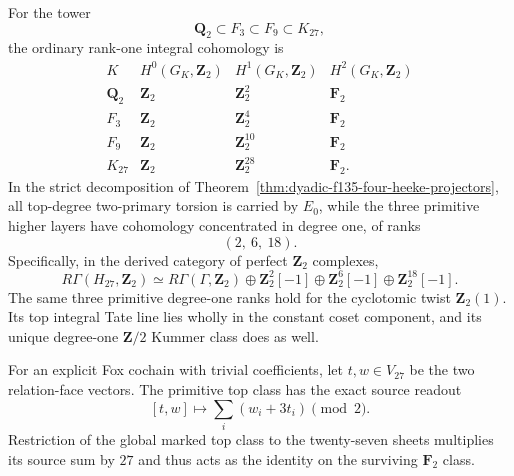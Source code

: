 \begin{corollary}
\label{cor:dyadic-f135-27sheet-cohom-layers}
For the tower
\[
\mathbf Q_2\subset
F_3\subset F_9\subset K_{27},
\]
the ordinary
rank-one integral
cohomology is
\[
\begin{array}{c|ccc}
K&H^0(G_K,\mathbf Z_2)&
H^1(G_K,\mathbf Z_2)&
H^2(G_K,\mathbf Z_2)\\ \hline
\mathbf Q_2&\mathbf Z_2&\mathbf Z_2^2&\mathbf F_2\\
F_3&\mathbf Z_2&\mathbf Z_2^4&\mathbf F_2\\
F_9&\mathbf Z_2&\mathbf Z_2^{10}&\mathbf F_2\\
K_{27}&\mathbf Z_2&\mathbf Z_2^{28}&\mathbf F_2.
\end{array}
\]
In the
strict decomposition
of
Theorem~\ref{thm:dyadic-f135-four-heeke-projectors},
all top-degree
two-primary torsion
is carried by
$E_0$, while
the three primitive
higher layers have
cohomology concentrated
in degree one,
of ranks
\begin{equation}\label{eq:dyadic-f135-layer-H1-ledger}
\boxed{\qquad
(2,\ 6,\ 18).
\qquad}
\end{equation}
Specifically, in
the derived category
of perfect
$\mathbf Z_2$
complexes,
\begin{equation}\label{eq:dyadic-f135-odd-tower-derived-splitting}
\boxed{
R\Gamma(H_{27},\mathbf Z_2)
\simeq
R\Gamma(\Gamma,\mathbf Z_2)
\oplus\mathbf Z_2^2[-1]
\oplus\mathbf Z_2^6[-1]
\oplus\mathbf Z_2^{18}[-1].
}
\end{equation}
The same
three primitive
degree-one ranks
hold for the
cyclotomic twist
$\mathbf Z_2(1)$.
Its top
integral Tate line
lies wholly in
the constant
coset component,
and its unique
degree-one
$\mathbf Z/2$
Kummer class
does as well.

For an explicit
Fox cochain with
trivial coefficients,
let $t,w\in V_{27}$
be the two
relation-face
vectors.
The primitive
top class
has the exact
source readout
\begin{equation}\label{eq:dyadic-f135-27face-Tate-readout}
\boxed{\qquad
[t,w]\longmapsto
\sum_i(w_i+3t_i)
\pmod2.
\qquad}
\end{equation}
Restriction of
the global marked
top class to
the twenty-seven
sheets multiplies
its source
sum by $27$
and thus acts as
the identity
on the surviving
$\mathbf F_2$
class.
\end{corollary}

